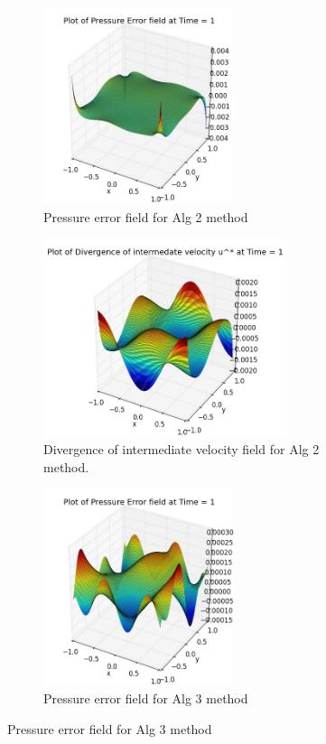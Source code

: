 \begin{figure}[H]
	\centering
	\begin{subfigure}[t]{2.2in}
		\centering
		\includegraphics[width=2.2in]{figures/Pm1b_pf2_np_P_error_t_1_grid_120.jpg}
		\caption{Pressure error field for Alg 2 method}\label{fig:6.19a}		
	\end{subfigure}
	\quad
	\begin{subfigure}[t]{2.8in}
		\centering
		\includegraphics[width=2.8in]{figures/Pm1b_pf2_np_div_uvstar_t_1_grid_120.jpg}
		\caption{Divergence of intermediate velocity field for Alg 2 method. }\label{fig:6.19b}
	\end{subfigure}
	\quad
	\centering
	\begin{subfigure}[t]{2.2in}
		\centering
		\includegraphics[width=2.2in]{figures/Pm2_pf2_cN_np_P_error_t_1_grid_120.jpg}
		\caption{Pressure error field for Alg 3 method}\label{fig:6.19c}		

\end{subfigure}
\end{figure}
